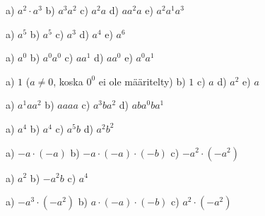 \begin{tehtavasivu}
    \begin{tehtava}
        a) $a^2\cdot a^3$ \qquad
        b) $a^3a^2$ \qquad
        c) $a^2 a$ \qquad
        d) $a a^2 a$ \qquad
        e) $a^2a^1a^3$
        
        \begin{vastaus}
            a) $a^5$ \qquad
            b) $a^5$ \qquad
            c) $a^3$ \qquad
            d) $a^4$ \qquad
            e) $a^6$
        \end{vastaus}
    \end{tehtava}
    
    \begin{tehtava}
        a) $a^0$ \qquad
        b) $a^0a^0$ \qquad
        c) $a a^1$ \qquad
        d) $aa^0$ \qquad
        e) $a^0a^1$
        
        \begin{vastaus}
            a) $1$ \quad ($a\neq0$, koska $0^0$ ei ole määritelty) \qquad
            b) $1$ \qquad
            c) $a$ \qquad
            d) $a^2$ \qquad
            e) $a$
        \end{vastaus}
    \end{tehtava}
    
    \begin{tehtava}
        a) $a^1 a a^2$ \qquad
        b) $aaaa$ \qquad
        c) $a^3ba^2$ \qquad
        d) $aba^0ba^1$
        
        \begin{vastaus}
            a) $ a^4$ \qquad
            b) $a^4$ \qquad
            c) $a^5b$ \qquad
            d) $a^2b^2$
        \end{vastaus}
    \end{tehtava}
       

    \begin{tehtava}
        a) $-a\cdot(-a)$ \qquad
        b) $-a\cdot(-a)\cdot(-b)$ \qquad
        c) $-a^2\cdot(-a^2)$
    
        \begin{vastaus}
            a) $a^2$ \qquad
            b) $-a^2b$ \qquad
            c) $a^4$
        \end{vastaus}
    \end{tehtava}

    \begin{tehtava}
        a) $-a^3\cdot(-a^2)$ \qquad
        b) $a\cdot(-a)\cdot(-b)$ \qquad
        c) $a^2\cdot(-a^2)$
        

\end{tehtava}
\end{tehtavasivu}
